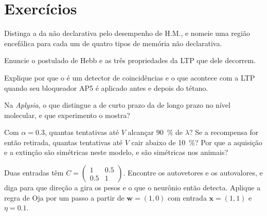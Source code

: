 \section{Exercícios}

\begin{exercise}[$\star$]\label{exo:b3:learning-memory:1}
Distinga a  da não declarativa pelo desempenho de
H.M., e nomeie uma região encefálica para cada um de quatro tipos de
memória não declarativa.
\end{exercise}

\begin{exercise}[$\star$]\label{exo:b3:learning-memory:2}
Enuncie o postulado de Hebb e as três propriedades da LTP que dele
decorrem.
\end{exercise}

\begin{exercise}[$\star$]\label{exo:b3:learning-memory:3}
Explique por que o  é um detector de coincidências e o que
acontece com a LTP quando seu bloqueador AP5 é aplicado antes e depois
do tétano.
\end{exercise}

\begin{exercise}[$\star$]\label{exo:b3:learning-memory:4}
Na \emph{Aplysia}, o que distingue a  de curto prazo da de
longo prazo no nível molecular, e que experimento o mostra?
\end{exercise}

\begin{exercise}[$\star\star$]\label{exo:b3:learning-memory:5}
Com $\alpha = 0.3$, quantas tentativas até $V$ alcançar \qty{90}{\%} de
$\lambda$? Se a recompensa for então retirada, quantas tentativas até
$V$ cair abaixo de \qty{10}{\%}? Por que a aquisição e a extinção são
simétricas neste modelo, e são simétricas nos animais?
\end{exercise}

\begin{exercise}[$\star\star$]\label{exo:b3:learning-memory:6}
Duas entradas têm $C = \begin{pmatrix}1 & 0.5\\ 0.5 & 1\end{pmatrix}$.
Encontre os autovetores e os autovalores, e diga para que direção a
 gira os pesos e o que o neurônio então detecta. Aplique a
regra de Oja por um passo a partir de $\mathbf{w} = (1,0)$ com entrada
$\mathbf{x}
= (1,1)$ e $\eta = 0.1$.
\end{exercise}

